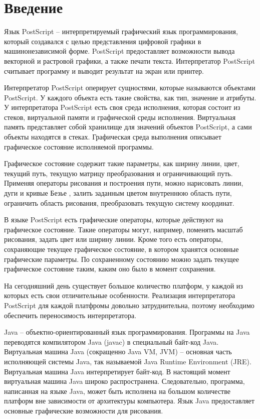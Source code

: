 \documentclass[14pt]{extarticle}
\begin{document}
\fi

\section*{Введение}
\sloppy
  
 
Язык PostScript – интерпретируемый графический язык программирования, который создавался с целью представления цифровой графики в машинонезависимой форме\cite{plrm}. PostScript предоставляет возможности вывода векторной и растровой графики, а также печати текста. Интерпретатор PostScript считывает программу и выводит результат на экран или принтер. 
  
Интерпретатор PostScript оперирует сущностями, которые называются объектами PostScript. У каждого объекта есть такие свойства, как тип, значение и атрибуты. У интерпретатора PostScript есть своя среда исполнения, которая состоит из стеков, виртуальной памяти и графической среды исполнения. Виртуальная память представляет собой хранилище для значений объектов PostScript, а сами объекты находятся в стеках. Графическая среда выполнения описывает графическое состояние исполняемой программы.

Графическое состояние содержит  такие параметры, как ширину линии,  цвет,  текущий путь, текущую матрицу преобразования и  ограничивающий путь.  Применяя операторы рисования и построения пути, можно нарисовать линии, дуги и кривые Безье \cite{graphics}, залить заданным цветом внутреннюю область  пути, ограничить область рисования, преобразовать текущую систему координат.


В языке PostScript есть графические операторы, которые действуют на графическое состояние. Такие операторы могут, например, поменять масштаб рисования, задать цвет или ширину линии. Кроме того есть операторы, сохраняющие текущее графическое состояние, в котором хранятся основные графические параметры. По сохраненному состоянию можно задать текущее графическое состояние таким, каким оно было в момент сохранения.  

На сегодняшний день существует большое количество платформ, у каждой из которых есть свои отличительные особенности. Реализация интерпретатора PostScript для каждой платфромы довольно затруднительна, поэтому  необходимо обеспечить переносимость интерпретатора. 

 Java – объектно-ориентированный язык программирования. Программы на Java переводятся компилятором Java (javac)  в специальный байт-код Java. Виртуальная машина Java (сокращенно Java VM, JVM) – основная часть исполняющей системы Java, так называемой Java Runtime Environment (JRE). Виртуальная машина Java интерпретирует байт-код. В настоящий момент виртуальная машина Java широко распространена. Следовательно, программа, написанная на языке Java, может быть исполнена на большом количестве платформ вне зависимости от архитектуры компьютера. Язык Java предоставляет основные графические возможности для рисования. 
 
\end{document}
